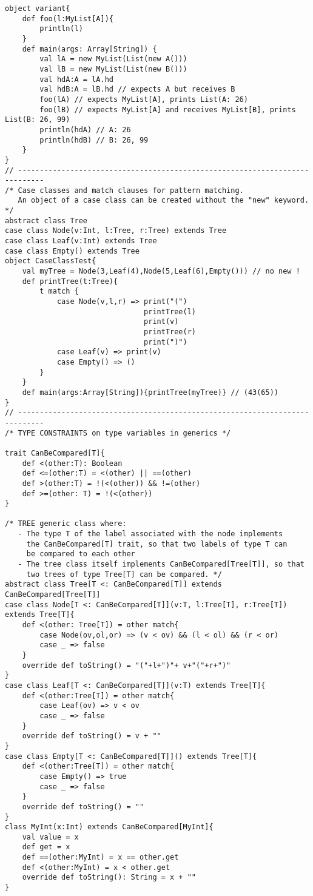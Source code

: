 \documentclass[10pt]{article}
\begin{document}
\begin{verbatim}
object variant{  
    def foo(l:MyList[A]){
        println(l)
    }
    def main(args: Array[String]) {
        val lA = new MyList(List(new A()))
        val lB = new MyList(List(new B()))
        val hdA:A = lA.hd
        val hdB:A = lB.hd // expects A but receives B
        foo(lA) // expects MyList[A], prints List(A: 26)
        foo(lB) // expects MyList[A] and receives MyList[B], prints List(B: 26, 99)
        println(hdA) // A: 26
        println(hdB) // B: 26, 99
    }
}
// ----------------------------------------------------------------------------
/* Case classes and match clauses for pattern matching.
   An object of a case class can be created without the "new" keyword. */
abstract class Tree
case class Node(v:Int, l:Tree, r:Tree) extends Tree
case class Leaf(v:Int) extends Tree
case class Empty() extends Tree
object CaseClassTest{
    val myTree = Node(3,Leaf(4),Node(5,Leaf(6),Empty())) // no new !
    def printTree(t:Tree){
        t match {
            case Node(v,l,r) => print("(") 
                                printTree(l) 
                                print(v)
                                printTree(r)
                                print(")")
            case Leaf(v) => print(v)
            case Empty() => ()
        }
    }
    def main(args:Array[String]){printTree(myTree)} // (43(65))
}
// ----------------------------------------------------------------------------
/* TYPE CONSTRAINTS on type variables in generics */

trait CanBeCompared[T]{
    def <(other:T): Boolean
    def <=(other:T) = <(other) || ==(other)
    def >(other:T) = !(<(other)) && !=(other)
    def >=(other: T) = !(<(other))
}

/* TREE generic class where:
   - The type T of the label associated with the node implements 
     the CanBeCompared[T] trait, so that two labels of type T can
     be compared to each other
   - The tree class itself implements CanBeCompared[Tree[T]], so that
     two trees of type Tree[T] can be compared. */
abstract class Tree[T <: CanBeCompared[T]] extends CanBeCompared[Tree[T]]
case class Node[T <: CanBeCompared[T]](v:T, l:Tree[T], r:Tree[T]) extends Tree[T]{
    def <(other: Tree[T]) = other match{
        case Node(ov,ol,or) => (v < ov) && (l < ol) && (r < or)
        case _ => false
    }
    override def toString() = "("+l+")"+ v+"("+r+")"
}
case class Leaf[T <: CanBeCompared[T]](v:T) extends Tree[T]{
    def <(other:Tree[T]) = other match{
        case Leaf(ov) => v < ov
        case _ => false
    }
    override def toString() = v + ""
}
case class Empty[T <: CanBeCompared[T]]() extends Tree[T]{
    def <(other:Tree[T]) = other match{
        case Empty() => true
        case _ => false
    }
    override def toString() = ""
}
class MyInt(x:Int) extends CanBeCompared[MyInt]{
    val value = x
    def get = x
    def ==(other:MyInt) = x == other.get
    def <(other:MyInt) = x < other.get
    override def toString(): String = x + ""
}


\end{verbatim}
\end{document}
